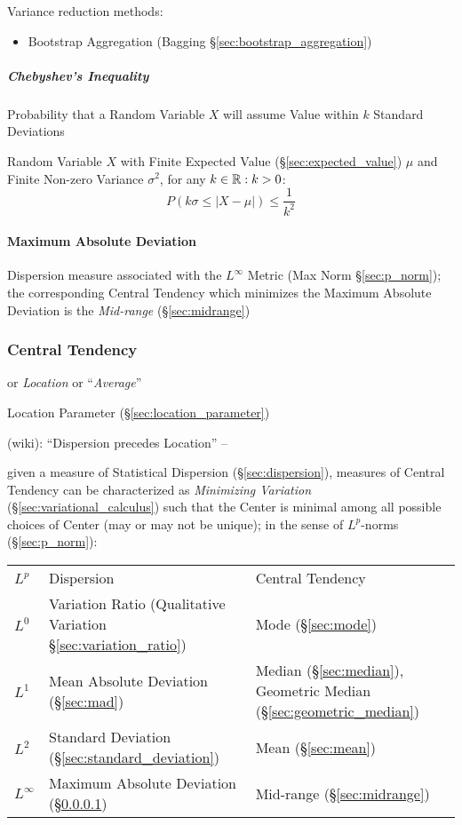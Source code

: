 Variance reduction methods:
\begin{itemize}
  \item Bootstrap Aggregation (Bagging \S\ref{sec:bootstrap_aggregation})
\end{itemize}



\subparagraph{Chebyshev's Inequality}\label{sec:chebyshevs_inequality}\hfill

Probability that a Random Variable $X$ will assume Value within $k$ Standard
Deviations

Random Variable $X$ with Finite Expected Value (\S\ref{sec:expected_value})
$\mu$ and Finite Non-zero Variance $\sigma^2$, for any $k \in \mathbb{R} : k > 0$:
\[
  P(k\sigma \leq |X - \mu|) \leq \frac{1}{k^2}
\]



\paragraph{Maximum Absolute Deviation}
\label{sec:maximum_absolute_deviation}\hfill

Dispersion measure associated with the $L^\infty$ Metric (Max Norm
\S\ref{sec:p_norm}); the corresponding Central Tendency which minimizes the
Maximum Absolute Deviation is the \emph{Mid-range} (\S\ref{sec:midrange})



\subsubsection{Central Tendency}\label{sec:central_tendency}

or \emph{Location} or ``\emph{Average}''

\fist Location Parameter (\S\ref{sec:location_parameter})

(wiki): ``Dispersion precedes Location'' --

given a measure of Statistical Dispersion (\S\ref{sec:dispersion}), measures of
Central Tendency can be characterized as \emph{Minimizing Variation}
(\S\ref{sec:variational_calculus}) such that the Center is minimal among all
possible choices of Center (may or may not be unique); in the sense of
$L^p$-norms (\S\ref{sec:p_norm}):
\begin{tabular}{l l l}
  $L^p$ & Dispersion & Central Tendency \\
  $L^0$ & Variation Ratio (Qualitative Variation \S\ref{sec:variation_ratio})
    & Mode (\S\ref{sec:mode}) \\
  $L^1$ & Mean Absolute Deviation (\S\ref{sec:mad})
    & Median (\S\ref{sec:median}),
      Geometric Median (\S\ref{sec:geometric_median}) \\
  $L^2$ & Standard Deviation (\S\ref{sec:standard_deviation})
    & Mean (\S\ref{sec:mean}) \\
  $L^\infty$
    & Maximum Absolute Deviation (\S\ref{sec:maximum_absolute_deviation})
    & Mid-range (\S\ref{sec:midrange})
\end{tabular}



